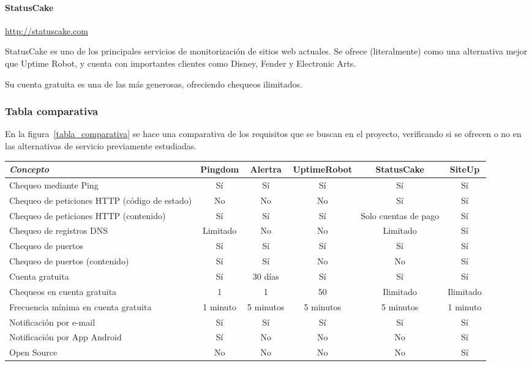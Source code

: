 \paragraph{StatusCake} \url{http://statuscake.com}

StatusCake es uno de los principales servicios de monitorización de sitios web
actuales. Se ofrece (literalmente) como una alternativa mejor que Uptime Robot,
y cuenta con importantes clientes como Disney, Fender y Electronic Arts.

Su cuenta gratuita es una de las más generosas, ofreciendo chequeos ilimitados.

\subsubsection{Tabla comparativa}

En la figura~\ref{tabla_comparativa} se hace una comparativa de los requisitos
que se buscan en el proyecto, verificando si se ofrecen o no en las alternativas de
servicio previamente estudiadas.

\begin{sidewaystable}
  \centering
  \begin{tabular}{|l|c|c|c|c|c|}
    \hline
    \textit{Concepto} & Pingdom & Alertra & UptimeRobot & StatusCake & SiteUp\\
    \hline
    Chequeo mediante Ping & Sí & Sí & Sí & Sí & Sí \\
    \hline    
    Chequeo de peticiones HTTP (código de estado) & No & No & No & Sí & Sí \\
    \hline
    Chequeo de peticiones HTTP (contenido) & Sí & Sí & Sí & Solo cuentas de pago & Sí \\
    \hline
    Chequeo de registros DNS & Limitado & No & No & Limitado & Sí \\
    \hline
    Chequeo de puertos & Sí & Sí & Sí & Sí & Sí \\
    \hline
    Chequeo de puertos (contenido) & Sí & Sí & No & No & Sí \\
    \hline
    Cuenta gratuita & Sí & 30 días & Sí & Sí & Sí \\
    \hline    
    Chequeos en cuenta gratuita & 1 & 1 & 50 & Ilimitado & Ilimitado \\
    \hline
    Frecuencia mínima en cuenta gratuita & 1 minuto & 5 minutos & 5 minutos & 5 minutos & 1 minuto \\
    \hline
    Notificación por e-mail & Sí & Sí & Sí & Sí & Sí \\
    \hline
    Notificación por App Android & Sí & No & No & No & Sí \\
    \hline
    Open Source & No & No & No & No & Sí \\
    \hline   
  \end{tabular}
  \caption{Tabla comparativa de servicios de monitorización}
  \label{tabla_comparativa}
\end{sidewaystable}

